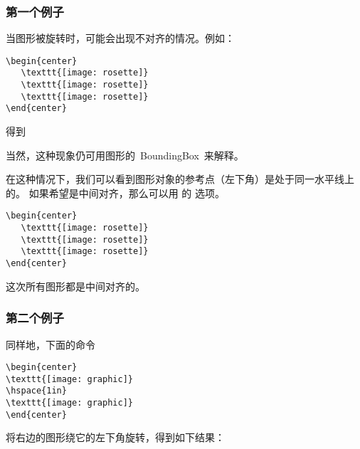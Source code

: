 \subsubsection{第一个例子}

当图形被旋转时，可能会出现不对齐的情况。例如：

\begin{lstlisting}
\begin{center}
   \texttt{[image: rosette]}
   \texttt{[image: rosette]}
   \texttt{[image: rosette]}
\end{center}
\end{lstlisting}
得到

\begin{center}
	\resizebox*{!}{1in}{\usebox{\boxrosette}}
\end{center}
当然，这种现象仍可用图形的~BoundingBox~来解释。

\begin{center}
	\resizebox*{!}{1in}{\usebox{\boxrosettebox}}
\end{center}
在这种情况下，我们可以看到图形对象的参考点（左下角）是处于同一水平线上的。
如果希望是中间对齐，那么可以用  的  选项。
\begin{lstlisting}
\begin{center}
   \texttt{[image: rosette]}
   \texttt{[image: rosette]}
   \texttt{[image: rosette]}
\end{center}
\end{lstlisting}
这次所有图形都是中间对齐的。

\begin{center}
	\resizebox*{!}{1in}{\usebox{\boxrosette}}
\end{center}

\subsubsection{第二个例子}
同样地，下面的命令
\begin{lstlisting}
\begin{center}
\texttt{[image: graphic]}
\hspace{1in}
\texttt{[image: graphic]}
\end{center}
\end{lstlisting}
将右边的图形绕它的左下角旋转，得到如下结果：
\begin{center}
	\resizebox{1in}{!}{\usebox{\boxgraphic}}
	\hspace{1in}
\end{center}

